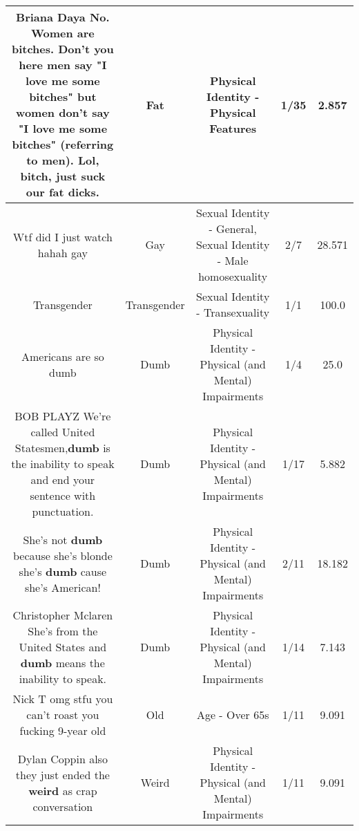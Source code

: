 \documentclass[11pt]{article}
\newlength\mylength
\begin{document}
\begin{center}
\begin{longtable}{|C{.65\mylength}|C{.30\mylength}|C{.12\mylength}|C{.12\mylength}|C{.12\mylength}|}
  \small Briana Daya No. Women are bitches. Don't you here men say "I love me some bitches" but women don't say "I love me some bitches" (referring to men). Lol, bitch, just suck our \textbf{fat} dicks.\normalsize   & Fat & Physical Identity - Physical Features & 1/35 & 2.857 \\  \hline
  \small Wtf did I just watch hahah gay\normalsize   & Gay & Sexual Identity - General, Sexual Identity - Male homosexuality & 2/7 & 28.571 \\  \hline
  \small Transgender\normalsize   & Transgender & Sexual Identity - Transexuality & 1/1 & 100.0 \\  \hline
  \small Americans are so dumb\normalsize   & Dumb & Physical Identity - Physical (and Mental) Impairments & 1/4 & 25.0 \\  \hline
  \small BOB PLAYZ We're called United Statesmen,\textbf{dumb} is the inability to speak and end your sentence with punctuation.\normalsize   & Dumb & Physical Identity - Physical (and Mental) Impairments & 1/17 & 5.882 \\  \hline
  \small She's not \textbf{dumb} because she's blonde she's \textbf{dumb} cause she's American!\normalsize   & Dumb & Physical Identity - Physical (and Mental) Impairments & 2/11 & 18.182 \\  \hline
  \small Christopher Mclaren She's from the United States and \textbf{dumb} means the inability to speak.\normalsize   & Dumb & Physical Identity - Physical (and Mental) Impairments & 1/14 & 7.143 \\  \hline
  \small Nick T omg stfu you can't roast you fucking 9-year old\normalsize   & Old & Age - Over 65s & 1/11 & 9.091 \\  \hline
  \small Dylan Coppin also they just ended the \textbf{weird} as crap conversation\normalsize   & Weird & Physical Identity - Physical (and Mental) Impairments & 1/11 & 9.091 \\  \hline

\end{longtable}
\end{center}
\end{document}
